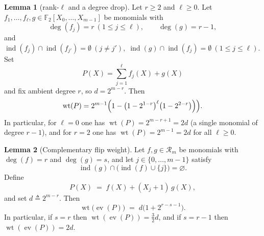 \documentclass[conference]{IEEEtran}
\theoremstyle{definition}
\newtheorem{lemma}{Lemma}
\newcommand{\wt}{\operatorname{wt}}
\newcommand{\ind}{\operatorname{ind}}
\newcommand{\ev}{\operatorname{ev}}
\newcommand{\ft}{\mathbb{F}_2}
\begin{document}
\begin{lemma}[rank-$\ell$ and a degree drop]
\label{lem:affine-deg-r}
Let $r\ge2$ and $\ell\ge0$. Let $f_1,\dots,f_\ell,g\in\ft[X_0,\dots,X_{m-1}]$
be monomials with
\[
\deg(f_j)=r\ (1\le j\le\ell),\qquad
\deg(g)=r-1,
\]
and
\(
\ind(f_j)\cap\ind(f_{j'})=\emptyset\ (j\neq j'),\;
\ind(g)\cap\ind(f_j)=\emptyset\ (1\le j\le\ell).
\)
Set
\begin{equation}\label{eq:rank-l-deg-drop}
P(X)=\sum_{j=1}^{\ell} f_j(X)+g(X)
\end{equation}
and fix ambient degree $r$, so $d=2^{m-r}$. Then
\[
\wt(P)
=
2^{m-1}
\Bigl(
  1 - \bigl(1-2^{1-r}\bigr)^{\ell}\bigl(1-2^{2-r}\bigr)
\Bigr)
\Bigr).
\]
In particular, for $\ell=0$ one has $\wt(P)=2^{m-r+1}=2d$ (a single
monomial of degree $r-1$), and for $r=2$ one has $\wt(P)=2^{m-1}=2d$
for all $\ell\ge0$.
\end{lemma}










\begin{lemma}[Complementary flip weight]
\label{lem:compl-flip}
Let $f,g\in\mathcal R_m$ be monomials with $\deg(f)=r$ and $\deg(g)=s$, and let
$j\in\{0,\dots,m-1\}$ satisfy
\[
\ind(g)\cap\bigl(\ind(f)\cup\{j\}\bigr)=\varnothing.
\]
Define
\[
P(X) \;=\; f(X) + (X_j+1)\,g(X),
\]
and set $d \triangleq 2^{m-r}$. Then
\begin{equation}
\label{eq:compl-flip-weight}
\wt\bigl(\ev(P)\bigr) \;=\; d\bigl(1+2^{r-s-1}\bigr).
\end{equation}
In particular, if $s=r$ then $\wt(\ev(P))=\tfrac32 d$, and if $s=r-1$ then
$\wt(\ev(P))=2d$.
\end{lemma}
\end{document}
